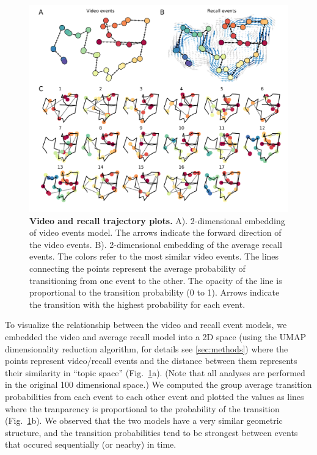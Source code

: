 \documentclass{article}
\begin{document}
{\begin{figure}[t!]
\centering
\includegraphics[width=1\textwidth]{figs/4_trajectory.pdf}
\caption{\small \textbf{Video and recall trajectory plots.} A). 2-dimensional embedding of video events model. The arrows indicate the forward direction of the video events. B). 2-dimensional embedding of the average recall events.  The colors refer to the most similar video events.  The lines connecting the points represent the average probability of transitioning from one event to the other. The opacity of the line is proportional to the transition probability (0 to 1). Arrows indicate the transition with the highest probability for each event.}
\label{fig:trajectory}
\end{figure}

To visualize the relationship between the video and recall event models, we embedded the video and average recall model into a 2D space (using the UMAP dimensionality reduction algorithm, for details see \ref{sec:methods}) where the points represent video/recall events and the distance between them represents their similarity in ``topic space'' (Fig.~\ref{fig:trajectory}a). (Note that all analyses are performed in the original 100 dimensional space.) We computed the group average transition probabilities from each event to each other event and plotted the values as lines where the tranparency is proportional to the probability of the transition (Fig.~\ref{fig:trajectory}b).  We observed that the two models have a very similar geometric structure, and the transition probabilities tend to be strongest between events that occured sequentially (or nearby) in time.

}
\end{document}
